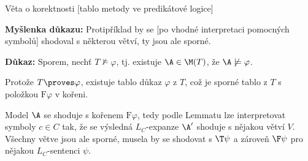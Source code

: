 \documentclass{beamer}
\begin{document}
\begin{frame}{Věta o korektnosti [tablo metody ve predikátové logice]}

    \pause

    \medskip

    \pause
    \textbf{Myšlenka důkazu:} Protipříklad by se [po vhodné interpretaci pomocných symbolů] shodoval s některou větví, ty jsou ale sporné.

    \medskip

    \pause
    \textbf{Důkaz:} \pause Sporem, nechť $T\not\models\varphi$, tj. existuje $\A\in\M(T)$, že $\A\not\models\varphi$.
    
    \pause
    Protože $T\proves\varphi$, existuje tablo důkaz $\varphi$ z $T$, což je sporné tablo z $T$ s položkou $\mathrm{F}\varphi$ v kořeni. 
        
    \pause
    Model $\A$ se shoduje s kořenem $\mathrm{F}\varphi$, tedy podle Lemmatu lze interpretovat symboly $c\in C$ tak, že se výsledná $L_C$-expanze $\A'$ shoduje s nějakou větví $V$. \pause Všechny větve jsou ale sporné, musela by se shodovat s $\T\psi$ a zároveň $\F\psi$ pro nějakou $L_C$-sentenci $\psi$.\hfill\qedsymbol

\end{frame}
\end{document}
